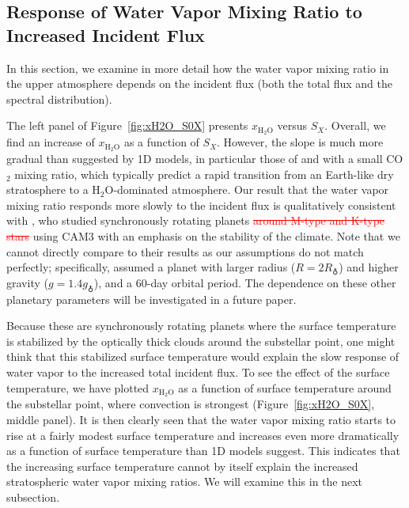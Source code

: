 \documentclass[11pt,numberedappendix,twocolappendix,]{emulateapj}
\def\water{H$_2$O}
\def\xwater{$x_\text{\water}$}
\def\wv{water vapor}
\def\changeYF#1#2{\textcolor{red}{\sout{#1} #2}}
\begin{document}
\subsection{Response of Water Vapor Mixing Ratio to Increased Incident Flux}
\label{ss:result_H2Omixingratio}


In this section, we examine in more detail how the \wv{} mixing ratio in the upper atmosphere depends on the incident flux (both the total flux and the spectral distribution). 

The left panel of Figure~\ref{fig:xH2O_S0X} presents \xwater{} versus $S_X$. 
Overall, we find an increase of \xwater{} as a function of $S_X$. 
However, the slope is much more gradual than suggested by 1D models, in particular those  of \citet{Kasting1993} and \citet{Wordsworth2013} with a small CO$_2$ mixing ratio, which typically predict a rapid transition from an Earth-like dry stratosphere to a \water{}-dominated atmosphere. 
Our result that the \wv{} mixing ratio responds more slowly to the incident flux is qualitatively consistent with \citet{Yang2013}, who studied synchronously rotating planets \changeYF{around M-type and K-type stars}{} using CAM3 with an emphasis on the stability of the climate. 
Note that we cannot directly compare to their results as our assumptions do not match perfectly; specifically, \cite{Yang2013} assumed a planet with larger radius ($R=2R_\earth$) and higher gravity ($g=1.4g_\earth$), and a 60-day orbital period. 
The dependence on these other planetary parameters will be investigated in a future paper. 

Because these are synchronously rotating planets where the surface temperature is stabilized by the optically thick clouds around the substellar point, one might think that this stabilized surface temperature would explain the slow  response of \wv{} to the increased total incident flux. 
To see the effect of the surface temperature, we have plotted \xwater{} as a function of surface temperature around the substellar point, where convection is strongest (Figure~\ref{fig:xH2O_S0X}, middle panel). 
It is then clearly seen that the \wv{}  mixing ratio starts to rise at a fairly modest surface temperature and increases even more dramatically as a function of surface temperature than 1D models suggest. 
This indicates that the increasing surface temperature cannot by itself explain the increased stratospheric \wv{} mixing ratios. 
We will examine this in the next subsection. 

\end{document}
